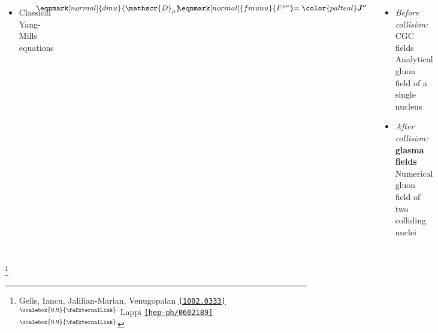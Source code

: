 \documentclass[aspectratio=169,11pt,usenames,dvipsnames]{beamer}
\renewcommand{\thefootnote}{}
\newcommand\blfootnote[1]{%
  \begingroup
  \renewcommand\thefootnote{}\footnote{#1}%
  \addtocounter{footnote}{-1}%
  \endgroup
}
\begin{document}
\begin{frame}
\begin{columns}[onlytextwidth,t]
            \begin{itemize}\itemsep0em 
                \item Classical Yang-Mills equations
            \end{itemize}
            \vspace{20pt}
            \renewcommand{\eqnhighlightheight}{\vphantom{\mathcal{D}_\mu}\mathstrut}\begin{equation*}
                \hspace{-40pt}\eqnmark[normal]{dmu}{\mathscr{D}_\mu}\hspace{-3pt}\eqnmark[normal]{fmunu}{F^{\mu\nu}}\hspace{-3pt}={\color{palteal}\boldsymbol{J^\nu}}
                \end{equation*}
            \vspace{5pt}
            {\footnotesize
            \begin{itemize}\itemsep0em 
                \item \textit{Before collision:} CGC fields\\[1pt] 
                {\color{lightgray} Analytical gluon field of a single nucleus}
                \item \textit{After collision:} {\color{palgold}\bfseries glasma fields}\\[1pt] 
                {\color{lightgray} Numerical gluon field of two colliding nuclei}
            \end{itemize}}
    \end{columns}
    \blfootnote{\scriptsize Gelis, Iancu, Jalilian-Marian, Venugopalan \href{https://arxiv.org/abs/1002.0333}{{\color{palviolet}\texttt{[1002.0333]}$^\text{\scalebox{0.9}{\faExternalLink}}$}} Lappi \href{https://arxiv.org/abs/hep-ph/0602189}{{\color{palgold}\texttt{[hep-ph/0602189]}$^\text{\scalebox{0.9}{\faExternalLink}}$}}}
\end{frame}
\end{document}
